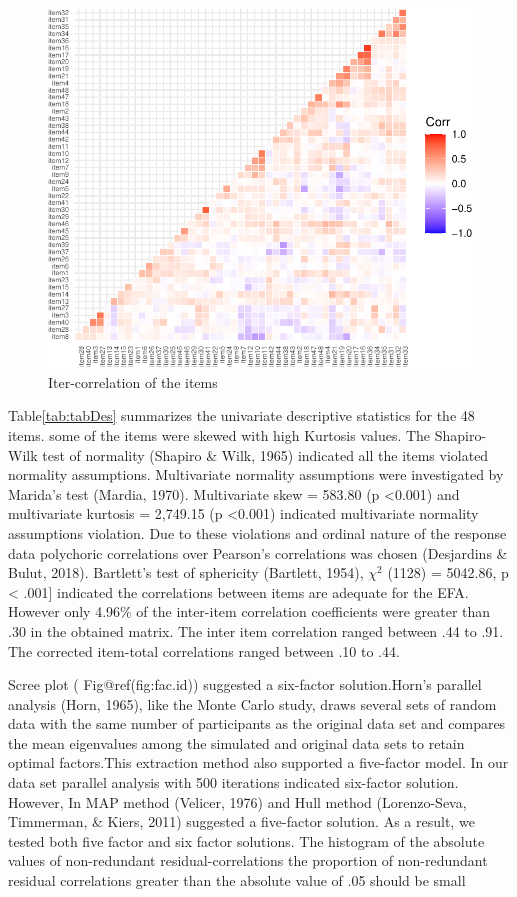 \documentclass[
  english,
  man]{apa6}
\begin{document}
\begin{figure}
\includegraphics[width=0.5\linewidth]{manuscript_files/figure-latex/figCor-1} \caption{Iter-correlation of the items}\label{fig:figCor}
\end{figure}

Table\ref{tab:tabDes} summarizes the univariate descriptive statistics for the 48 items. some of the items were skewed with high Kurtosis values. The Shapiro-Wilk test of normality (Shapiro \& Wilk, 1965) indicated all the items violated normality assumptions. Multivariate normality assumptions were investigated by Marida's test (Mardia, 1970). Multivariate skew = 583.80 (p \textless0.001) and multivariate kurtosis = 2,749.15 (p \textless0.001) indicated multivariate normality assumptions violation. Due to these violations and ordinal nature of the response data polychoric correlations over Pearson's correlations was chosen (Desjardins \& Bulut, 2018). Bartlett's test of sphericity (Bartlett, 1954), \(\chi^2\) (1128) = 5042.86, p \textless{} .001{]} indicated the correlations between items are adequate for the EFA. However only 4.96\% of the inter-item correlation coefficients were greater than .30 in the obtained matrix. The inter item correlation ranged between .44 to .91. The corrected item-total correlations ranged between .10 to .44.

Scree plot ( Fig@ref(fig:fac.id)) suggested a six-factor solution.Horn's parallel analysis (Horn, 1965), like the Monte Carlo study, draws several sets of random data with the same number of participants as the original data set and compares the mean eigenvalues among the simulated and original data sets to retain optimal factors.This extraction method also supported a five-factor model. In our data set parallel analysis with 500 iterations indicated six-factor solution. However, In MAP method (Velicer, 1976) and Hull method (Lorenzo-Seva, Timmerman, \& Kiers, 2011) suggested a five-factor solution. As a result, we tested both five factor and six factor solutions. The histogram of the absolute values of non-redundant residual-correlations the proportion of non-redundant residual correlations greater than the absolute value of .05 should be small
\end{document}
